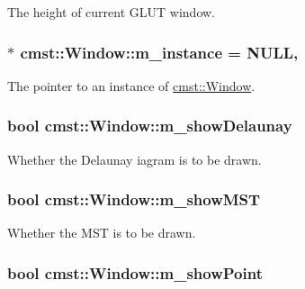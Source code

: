 The height of current GLUT window. 

\subsubsection[{\texorpdfstring{m\_instance}{m_instance}}]{ $\ast$ cmst::Window::m\_instance = NULL\hspace{0.3cm}{\ttfamily [static]}, {\ttfamily [private]}}\hypertarget{classcmst_1_1_window_a04ea9e382288b5d903542ee3f53b3617}{}\label{classcmst_1_1_window_a04ea9e382288b5d903542ee3f53b3617}


The pointer to an instance of \hyperlink{classcmst_1_1_window}{cmst::Window}. 

\subsubsection[{\texorpdfstring{m\_showDelaunay}{m_showDelaunay}}]{\setlength{\rightskip}{0pt plus 5cm}bool cmst::Window::m\_showDelaunay\hspace{0.3cm}{\ttfamily [private]}}\hypertarget{classcmst_1_1_window_a527a10c574abe1ad1e0279465b07a7f0}{}\label{classcmst_1_1_window_a527a10c574abe1ad1e0279465b07a7f0}


Whether the Delaunay iagram is to be drawn. 

\subsubsection[{\texorpdfstring{m\_showMST}{m_showMST}}]{\setlength{\rightskip}{0pt plus 5cm}bool cmst::Window::m\_showMST\hspace{0.3cm}{\ttfamily [private]}}\hypertarget{classcmst_1_1_window_a55136499feb82b469393b5f18bb1fe88}{}\label{classcmst_1_1_window_a55136499feb82b469393b5f18bb1fe88}


Whether the MST is to be drawn. 

\subsubsection[{\texorpdfstring{m\_showPoint}{m_showPoint}}]{\setlength{\rightskip}{0pt plus 5cm}bool cmst::Window::m\_showPoint\hspace{0.3cm}{\ttfamily [private]}}\hypertarget{classcmst_1_1_window_a10240817a263c467d61dad604c820f52}{}\label{classcmst_1_1_window_a10240817a263c467d61dad604c820f52}


